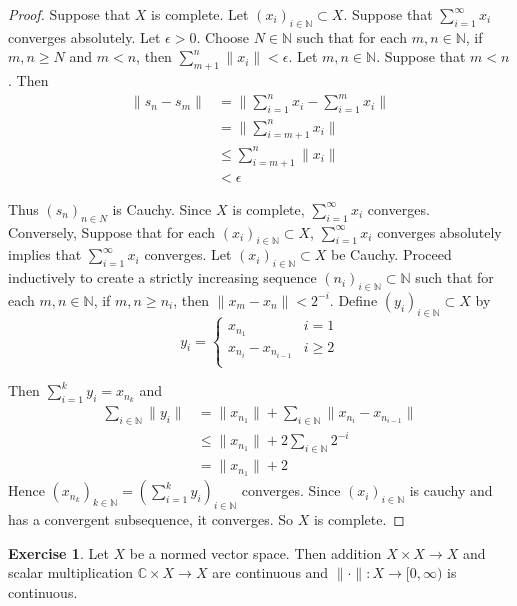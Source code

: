 \documentclass[12pt]{amsart}
\theoremstyle{definition}
\newtheorem{ex}[definition]{Exercise}
\newcommand{\ep}{\epsilon}
\newcommand{\C}{\mathbb{C}}
\newcommand{\N}{\mathbb{N}}
\newcommand{\Rg}{[0,\infty)}
\newcommand{\seq}[2]{(#1_{#2})_{#2 \in \N}}
\newcommand{\lex}[1]{\label{ex:#1}}
\begin{document}
	\begin{proof}
		Suppose that $X$ is complete. Let $\seq{x}{i} \subset X$. Suppose that $\sum_{i=1}^{\infty}x_i$ converges absolutely. Let $\ep >0$. Choose $N \in \N$ such that for each $m,n \in \N$, if $m, n \geq N$ and $m< n$, then $\sum_{m+1}^n \|x_i \|< \ep$. Let $m, n \in \N$. Suppose that $m<n$. Then 
		\begin{align*}
			\|s_n-s_m \|
			&= \bigg \|\sum_{i=1}^n x_i -\sum_{i=1}^m x_i\bigg \|\\
			&= \bigg\|\sum_{i=m+1}^{n} x_i \bigg \| \\
			& \leq \sum_{i=m+1}^n \|x_i \|\\
			& < \ep
		\end{align*}
		
		Thus $(s_n)_{n \in N}$ is Cauchy. Since $X$ is complete, $\sum_{i=1}^{\infty}x_i$ converges. \\
		Conversely, Suppose that for each $\seq{x}{i} \subset X$, $\sum_{i =1}^{\infty}x_i$ converges absolutely implies that $\sum_{i=1}^{\infty}x_i$ converges. Let $\seq{x}{i} \subset X$ be Cauchy. Proceed inductively to create a strictly increasing sequence $(n_i)_{i \in \N} \subset \N$ such that for each $m, n \in \N$, if $m,n \geq n_i$, then $ \|x_m-x_n \|< 2^{-i}$. Define $(y_i)_{i \in \N} \subset X$ by 
		\[ y_i = \begin{cases}
			x_{n_1} & i=1 \\
			x_{n_i} - x_{n_{i-1}} & i \geq 2\\
		\end{cases}\]
		
		Then $\sum_{i=1}^k y_i = x_{n_k}$ and 
		\begin{align*}
			\sum_{i \in \N} \|y_i \|
			&= \|x_{n_1} \|+ \sum_{i \in \N} \|x_{n_i}-x_{n_{i-1}} \|\\
			& \leq \|x_{n_1} \|+ 2\sum_{i \in \N}2^{-i}\\
			& = \|x_{n_1} \|+2
		\end{align*}
		Hence $(x_{n_k})_{k \in \N} = (\sum_{i=1}^k y_i)_{i\in \N}$ converges. Since $(x_i)_{i \in \N}$ is cauchy and has a convergent subsequence, it converges. So $X$ is complete.
	\end{proof}
	
	\begin{ex} \lex{}
		Let $X$ be a normed vector space. Then addition $X \times X \rightarrow X$ and scalar multiplication $\C \times X \rightarrow X$ are continuous and $\|\cdot \|:X \rightarrow \Rg$ is continuous.
	\end{ex}
	
\end{document}
